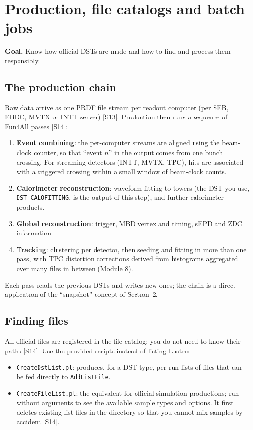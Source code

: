 \documentclass[11pt,letterpaper]{article}
\newcommand{\goal}[1]{\par\noindent\textbf{Goal.} #1\par}
\begin{document}
\section{Production, file catalogs and batch jobs}\label{sec:prod}
\goal{Know how official DSTs are made and how to find and process them responsibly.}

\subsection{The production chain}\label{sec:filecat}
Raw data arrive as one PRDF file stream per readout computer (per SEB, EBDC, MVTX or INTT server) [S13].
Production then runs a sequence of Fun4All passes [S14]:
\begin{enumerate}
\item \textbf{Event combining}: the per-computer streams are aligned using the beam-clock counter, so that ``event $n$'' in the output comes from one bunch crossing.
For streaming detectors (INTT, MVTX, TPC), hits are associated with a triggered crossing within a small window of beam-clock counts.
\item \textbf{Calorimeter reconstruction}: waveform fitting to towers (the DST you use, \texttt{DST\_CALOFITTING}, is the output of this step), and further calorimeter products.
\item \textbf{Global reconstruction}: trigger, MBD vertex and timing, sEPD and ZDC information.
\item \textbf{Tracking}: clustering per detector, then seeding and fitting in more than one pass, with TPC distortion corrections derived from histograms aggregated over many files in between (Module 8).
\end{enumerate}
Each pass reads the previous DSTs and writes new ones; the chain is a direct application of the ``snapshot'' concept of Section~2.

\subsection{Finding files}
All official files are registered in the file catalog; you do not need to know their paths [S14].
Use the provided scripts instead of listing Lustre:
\begin{itemize}
\item \texttt{CreateDstList.pl}: produces, for a DST type, per-run lists of files that can be fed directly to \texttt{AddListFile}.
\item \texttt{CreateFileList.pl}: the equivalent for official simulation productions; run without arguments to see the available sample types and options.
It first deletes existing list files in the directory so that you cannot mix samples by accident [S14].
\end{itemize}
\end{document}

